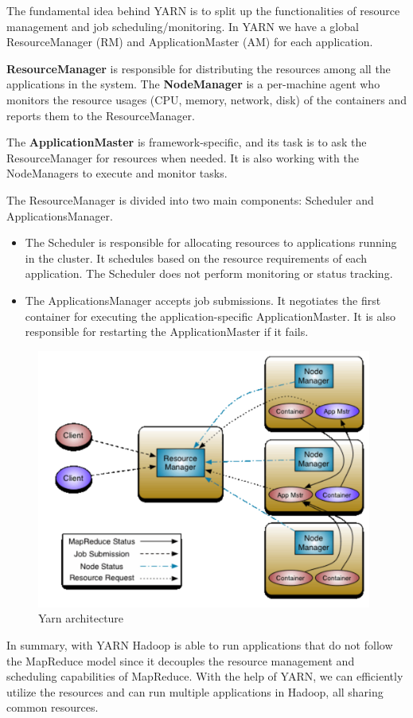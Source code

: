 The fundamental idea behind YARN is to split up the functionalities of resource management and job scheduling/monitoring. In YARN we have a global ResourceManager (RM) and ApplicationMaster (AM) for each application.

\textbf{ResourceManager} is responsible for distributing the resources among all the applications in the system. The \textbf{NodeManager} is a per-machine agent who monitors the resource usages (CPU, memory, network, disk) of the containers and reports them to the ResourceManager. 

The \textbf{ApplicationMaster} is framework-specific, and its task is to ask the ResourceManager for resources when needed. It is also working with the NodeManagers to execute and monitor tasks.

The ResourceManager is divided into two main components: Scheduler and ApplicationsManager.
\begin{itemize}
	\item The Scheduler is responsible for allocating resources to applications running in the cluster. It schedules based on the resource requirements of each application. The Scheduler does not perform monitoring or status tracking.
	\item The ApplicationsManager accepts job submissions. It negotiates the first container for executing the application-specific ApplicationMaster. It is also responsible for restarting the ApplicationMaster if it fails. 
\end{itemize}

\begin{figure}[H]
	\includegraphics[width=110mm, keepaspectratio]{figures/yarn.png}
	\centering
	\caption{Yarn architecture}
	\centering
\end{figure}

In summary, with YARN Hadoop is able to run applications that do not follow the MapReduce model since it decouples the resource management and scheduling capabilities of MapReduce. With the help of YARN, we can efficiently utilize the resources and can run multiple applications in Hadoop, all sharing common resources.